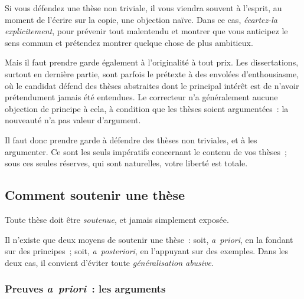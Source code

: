 \documentclass[a4paper,11pt]{article}
\newcommand{\apr}{\emph{a~priori}}
\newcommand{\apost}{\emph{a~posteriori}}
\begin{document}
\par

Si vous défendez une thèse non triviale, il vous viendra souvent à
l'esprit, au moment de l'écrire sur la copie, une objection naïve. Dans
ce cas, \emph{écartez-la explicitement}, pour prévenir tout malentendu
et montrer que vous anticipez le sens commun et prétendez montrer
quelque chose de plus ambitieux.

\par

Mais il faut prendre garde également à l'originalité à tout prix. Les
dissertations, surtout en dernière partie, sont parfois le prétexte à
des envolées d'enthousiasme, où le candidat défend des thèses abstraites
dont le principal intérêt est de n'avoir prétendument jamais été
entendues. Le correcteur n'a généralement aucune objection de principe à
cela, à condition que les thèses soient argumentées~: la nouveauté n'a
pas valeur d'argument.

\par

Il faut donc prendre garde à défendre des thèses non triviales, et à les
argumenter. Ce sont les seuls impératifs concernant le contenu de vos
thèses~; sous ces seules réserves, qui sont naturelles, votre liberté
est totale.



\subsection{Comment soutenir une thèse}

Toute thèse doit être \emph{soutenue}, et jamais simplement exposée.


\par

Il n'existe que deux moyens de soutenir une thèse~: soit, \apr{}, en la
fondant sur des principes~; soit, \apost{}, en l'appuyant sur des
exemples. Dans les deux cas, il convient d'éviter toute
\emph{généralisation abusive}.


\subsubsection{Preuves \apr{}~: les arguments}
\end{document}
